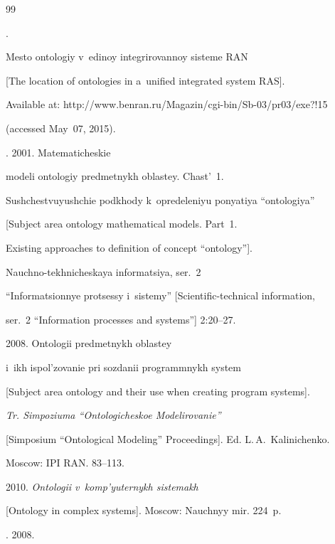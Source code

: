 {{\begin{thebibliography}{99}


. 


Mesto ontologiy v~edinoy integrirovannoy sisteme RAN 


[The location of ontologies in a~unified integrated system RAS]. 


Available at: {\sf http://www.benran.ru/Magazin/cgi-bin/Sb-03/pr03/exe?!15} 


(accessed May~07, 2015). 




. 2001. Matematicheskie


modeli ontologiy predmetnykh oblastey. Chast'~1. 


Sushchestvuyushchie podkhody k~opredeleniyu ponyatiya ``ontologiya''


[Subject area ontology mathematical models. Part~1. 


Existing approaches to definition of concept ``ontology''].


Nauchno-tekhnicheskaya informatsiya, ser.~2 


``Informatsionnye protsessy i~sistemy'' [Scientific-technical information, 


ser.~2 ``Information processes and systems''] 2:20--27. 




 2008. Ontologii predmetnykh oblastey 


i~ikh ispol'zovanie pri sozdanii programmnykh system 


[Subject area ontology and their use when creating program systems].


\textit{Tr. Simpoziuma ``Ontologicheskoe Modelirovanie''}


[Simposium ``Ontological Modeling'' Proceedings]. Ed. L.\,A.~Kalinichenko. 


Moscow: IPI RAN. 83--113.




 2010. \textit{Ontologii v~komp'yuternykh sistemakh} 


[Ontology in complex systems]. Moscow: Nauchnyy mir. 224~p.




. 2008. 



\end{thebibliography}}}
